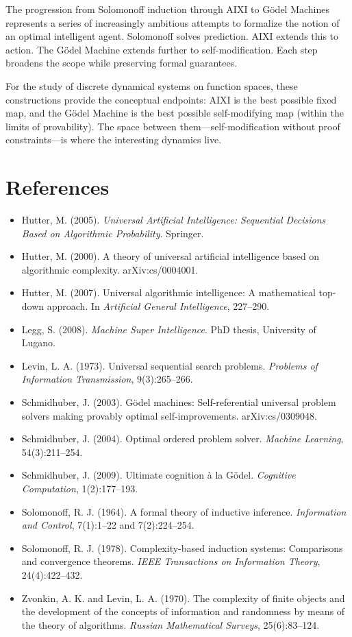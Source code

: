 The progression from Solomonoff induction through AIXI to Gödel Machines represents a series of increasingly ambitious attempts to formalize the notion of an optimal intelligent agent. Solomonoff solves prediction. AIXI extends this to action. The Gödel Machine extends further to self-modification. Each step broadens the scope while preserving formal guarantees.

For the study of discrete dynamical systems on function spaces, these constructions provide the conceptual endpoints: AIXI is the best possible fixed map, and the Gödel Machine is the best possible self-modifying map (within the limits of provability). The space between them---self-modification without proof constraints---is where the interesting dynamics live.



\section{References}

\begin{itemize}
\item Hutter, M. (2005). \textit{Universal Artificial Intelligence: Sequential Decisions Based on Algorithmic Probability}. Springer.
\item Hutter, M. (2000). A theory of universal artificial intelligence based on algorithmic complexity. arXiv:cs/0004001.
\item Hutter, M. (2007). Universal algorithmic intelligence: A mathematical top-down approach. In \textit{Artificial General Intelligence}, 227--290.
\item Legg, S. (2008). \textit{Machine Super Intelligence}. PhD thesis, University of Lugano.
\item Levin, L. A. (1973). Universal sequential search problems. \textit{Problems of Information Transmission}, 9(3):265--266.
\item Schmidhuber, J. (2003). Gödel machines: Self-referential universal problem solvers making provably optimal self-improvements. arXiv:cs/0309048.
\item Schmidhuber, J. (2004). Optimal ordered problem solver. \textit{Machine Learning}, 54(3):211--254.
\item Schmidhuber, J. (2009). Ultimate cognition à la Gödel. \textit{Cognitive Computation}, 1(2):177--193.
\item Solomonoff, R. J. (1964). A formal theory of inductive inference. \textit{Information and Control}, 7(1):1--22 and 7(2):224--254.
\item Solomonoff, R. J. (1978). Complexity-based induction systems: Comparisons and convergence theorems. \textit{IEEE Transactions on Information Theory}, 24(4):422--432.
\item Zvonkin, A. K. and Levin, L. A. (1970). The complexity of finite objects and the development of the concepts of information and randomness by means of the theory of algorithms. \textit{Russian Mathematical Surveys}, 25(6):83--124.
\end{itemize}



